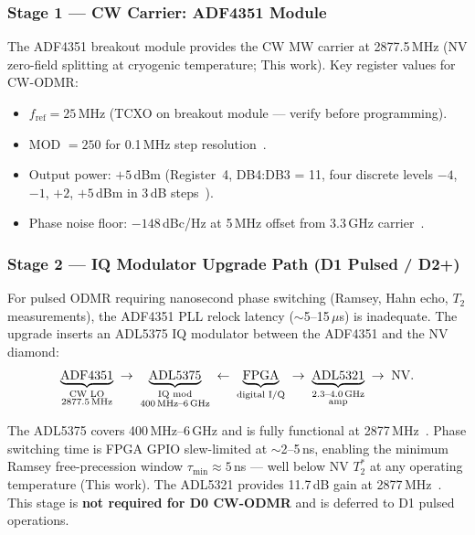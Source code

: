 \subsubsection{Stage 1 — CW Carrier: ADF4351 Module}
\label{sec:adf4351}

The ADF4351 breakout module provides the CW MW carrier at 2877.5\,MHz (NV zero-field
splitting at cryogenic temperature; This work). Key register values for CW-ODMR:

\begin{itemize}
  \item $f_\mathrm{ref} = 25$\,MHz (TCXO on breakout module — verify before programming).
  \item MOD $= 250$ for 0.1\,MHz step resolution~\cite{ADF4351datasheet}.
  \item Output power: $+5$\,dBm (Register~4, DB4:DB3 = 11, four discrete levels
    $-4$, $-1$, $+2$, $+5$\,dBm in 3\,dB steps~\cite{ADF4351datasheet}).
  \item Phase noise floor: $-148$\,dBc/Hz at 5\,MHz offset from 3.3\,GHz carrier~\cite{ADF4351datasheet}.
\end{itemize}

\subsubsection{Stage 2 — IQ Modulator Upgrade Path (D1 Pulsed / D2+)}
\label{sec:iq-upgrade}

For pulsed ODMR requiring nanosecond phase switching (Ramsey, Hahn echo, $T_2$
measurements), the ADF4351 PLL relock latency ($\sim$5--15\,$\mu$s) is inadequate.
The upgrade inserts an ADL5375 IQ modulator between the ADF4351 and the NV diamond:
\[
  \underbrace{\text{ADF4351}}_{\substack{\text{CW LO}\\\text{2877.5\,MHz}}}
  \;\to\;
  \underbrace{\text{ADL5375}}_{\substack{\text{IQ mod}\\\text{400\,MHz--6\,GHz}}}
  \;\leftarrow\;
  \underbrace{\text{FPGA}}_{\text{digital I/Q}}
  \;\to\;
  \underbrace{\text{ADL5321}}_{\substack{\text{2.3--4.0\,GHz}\\\text{amp}}}
  \;\to\; \text{NV.}
\]

The ADL5375 covers 400\,MHz--6\,GHz and is fully functional at 2877\,MHz~\cite{ADL5375datasheet}.
Phase switching time is FPGA GPIO slew-limited at $\sim$2--5\,ns, enabling the
minimum Ramsey free-precession window $\tau_\mathrm{min} \approx 5$\,ns —
well below NV $T_2^*$ at any operating temperature (This work).
The ADL5321 provides 11.7\,dB gain at 2877\,MHz~\cite{ADL5321datasheet}.
This stage is \textbf{not required for D0 CW-ODMR} and is deferred to D1 pulsed operations.

